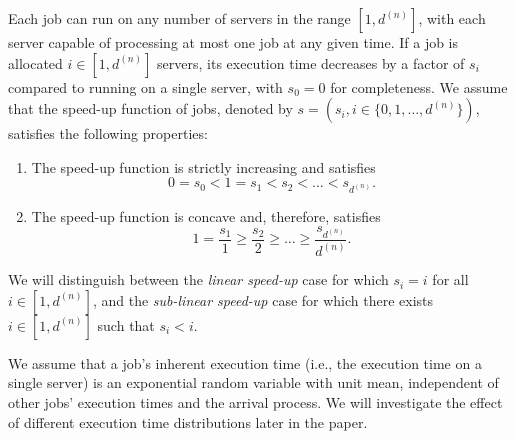 \documentclass[a4paper]{article}
\theoremstyle{plain}
\theoremstyle{definition}
\theoremstyle{case}
\theoremstyle{remark}
\begin{document}
Each job can run on any number of servers in the range $[1,d^{(n)}]$, with each server capable of processing at most one job at any given time. If a job is allocated $i \in [1,d^{(n)}]$ servers, its execution time decreases by a factor of $s_i$ compared to running on a single server, with $s_0=0$ for completeness. We assume that the speed-up function of jobs, denoted by $s=(s_i, i\in \{0,1,\ldots,d^{(n)}\})$, satisfies the following properties:
%
\begin{enumerate}[{\bf P1}]
    \item \label{prop:increasing}The speed-up function is strictly increasing and satisfies
    \begin{equation}
        0=s_0 < 1= s_1 < s_2 < \ldots < s_{d^{(n)}}.
        \label{eq:increasing}
    \end{equation}
    \item \label{prop:concavity}The speed-up function is concave and, therefore, satisfies
    \begin{equation}
        1=\frac{s_1}{1} \geq \frac{s_2}{2} \geq \ldots \geq \frac{s_{d^{(n)}}}{d^{(n)}}.
    \label{eq:concave}
    \end{equation}
\end{enumerate}
%
We will distinguish between the {\em linear speed-up} case for which $s_i=i$ for all $i \in [1,d^{(n)}]$, and the {\em sub-linear speed-up} case for which there exists $i \in [1,d^{(n)}]$ such that $s_i < i$.

We assume that a job's inherent execution time (i.e., the execution time on a single server) is an exponential random variable with unit mean, independent of other jobs' execution times and the arrival process. We will investigate the effect of different execution time distributions later in the paper.
\end{document}
